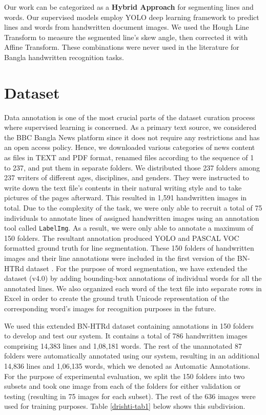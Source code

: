 \documentclass[runningheads]{llncs}
\begin{document}
Our work can be categorized as a \textbf{Hybrid Approach} for segmenting lines and words. Our supervised models employ YOLO deep learning framework to predict lines and words from handwritten document images. We used the Hough Line Transform to measure the segmented line's skew angle, then corrected it with Affine Transform. These combinations were never used in the literature for Bangla handwritten recognition tasks.

\section{Dataset}
\label{sec_3}
\vspace{-2mm}
Data annotation is one of the most crucial parts of the dataset curation process where supervised learning is concerned. As a primary text source, we considered the BBC Bangla News platform since it does not require any restrictions and has an open access policy. Hence, we downloaded various categories of news content as files in TEXT and PDF format, renamed files according to the sequence of 1 to 237, and put them in separate folders. We distributed those 237 folders among 237 writers of different ages, disciplines, and genders. They were instructed to write down the text file's contents in their natural writing style and to take pictures of the pages afterward. This resulted in 1,591 handwritten images in total. Due to the complexity of the task, we were only able to recruit a total of 75 individuals to annotate lines of assigned handwritten images using an annotation tool called \texttt{LabelImg}. As a result, we were only able to annotate a maximum of 150 folders. The resultant annotation produced YOLO and PASCAL VOC formatted ground truth for line segmentation. These 150 folders of handwritten images and their line annotations were included in the first version of the BN-HTRd dataset \cite{rahman2023bn}. For the purpose of word segmentation, we have extended the dataset (v4.0) by adding bounding-box annotations of individual words for all the annotated lines. We also organized each word of the text file into separate rows in Excel in order to create the ground truth Unicode representation of the corresponding word's images for recognition purposes in the future.

We used this extended BN-HTRd dataset containing annotations in 150 folders to develop and test our system. It contains a total of 786 handwritten images comprising 14,383 lines and 1,08,181 words. The rest of the unannotated 87 folders were automatically annotated using our system, resulting in an additional 14,836 lines and 1,06,135 words, which we denoted as Automatic Annotations. For the purpose of experimental evaluation, we split the 150 folders into two subsets and took one image from each of the folders for either validation or testing (resulting in 75 images for each subset). The rest of the 636 images were used for training purposes. Table \ref{drishti-tab1} below shows this subdivision.
\end{document}
